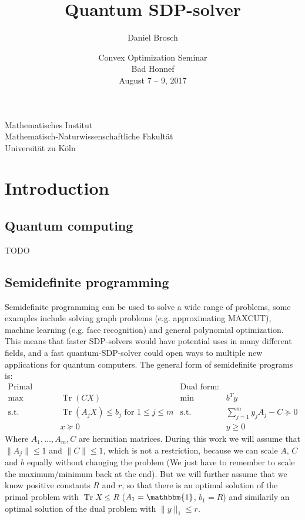 \documentclass[11pt,a4paper]{scrartcl}
\author{Daniel Brosch}
\title{Quantum SDP-solver}
\date{
  Convex Optimization Seminar \\
  Bad Honnef \\
  August 7 -- 9, 2017
}
\DeclareMathOperator{\Tr}{Tr}
\begin{document}
\maketitle
{
\centering
\Large
\vspace{4cm}
Mathematisches Institut\\
Mathematisch-Naturwissenschaftliche Fakultät\\
Universität zu Köln\\
}

\thispagestyle{empty}
\newpage
{}
\tableofcontents
\thispagestyle{empty}
\newpage
\pagestyle{headings}

\section{Introduction}
\subsection{Quantum computing}
TODO
\subsection{Semidefinite programming}
Semidefinite programming can be used to solve a wide range of problems, some examples include solving graph problems (e.g. approximating MAXCUT), machine learning (e.g. face recognition) and general polynomial optimization. This means that faster SDP-solvers would have potential uses in many different fields, and a fast quantum-SDP-solver could open ways to multiple new applications for quantum computers.
The general form of semidefinite programs is:
\begin{align*}
\text{Primal form:}\quad && \text{Dual form:}\quad &\\
\max\quad &\Tr(CX) &\min\quad &b^T y\\
\text{s.t.}\quad &\Tr(A_jX)\leq b_j \text{ for }1\leq j\leq m &\text{s.t.}\quad &\sum_{j=1}^m y_j A_j-C\succeq 0\\
& x\succeq 0 && y\geq 0
\end{align*}
Where $A_1,\ldots, A_m, C$ are hermitian matrices. During this work we will assume that $\|A_j\|\leq 1$ and $\|C\|\leq 1$, which is not a restriction, because we can scale $A$, $C$ and $b$ equally without changing the problem (We just have to remember to scale the maximum/minimum back at the end). But we will further assume that we know positive constants $R$ and $r$, so that there is an optimal solution of the primal problem with $\Tr X\leq R$ ($A_1=\mathbbm{1}$, $b_1=R$) and similarily an optimal solution of the dual problem with $\|y\|_1\leq r$. 
\end{document}
